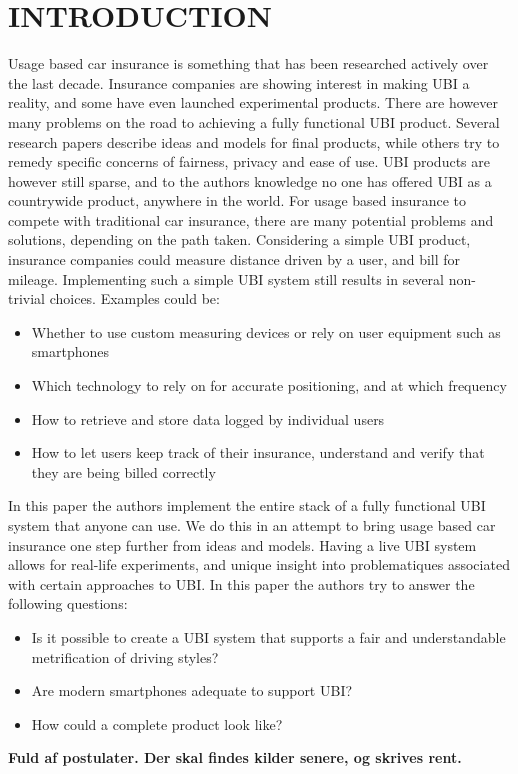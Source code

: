 \section{INTRODUCTION}\label{sec:intro}
Usage based car insurance is something that has been researched actively over the last decade. Insurance companies are showing interest in making UBI a reality, and some have even launched experimental products. There are however many problems on the road to achieving a fully functional UBI product. Several research papers describe ideas and models for final products, while others try to remedy specific concerns of fairness, privacy and ease of use. UBI products are however still sparse, and to the authors knowledge no one has offered UBI as a countrywide product, anywhere in the world.
For usage based insurance to compete with traditional car insurance, there are many potential problems and solutions, depending on the path taken. Considering a simple UBI product, insurance companies could measure distance driven by a user, and bill for mileage. Implementing such a simple UBI system still results in several non-trivial choices. Examples could be:

\begin{itemize}
\item Whether to use custom measuring devices or rely on user equipment such as smartphones
\item Which technology to rely on for accurate positioning, and at which frequency
\item How to retrieve and store data logged by individual users
\item How to let users keep track of their insurance, understand and verify that they are being billed correctly
\end{itemize}

In this paper the authors implement the entire stack of a fully functional UBI system that anyone can use. We do this in an attempt to bring usage based car insurance one step further from ideas and models. Having a live UBI system allows for real-life experiments, and unique insight into problematiques associated with certain approaches to UBI. In this paper the authors try to answer the following questions:

\begin{itemize}
\item Is it possible to create a UBI system that supports a fair and understandable metrification of driving styles?
\item Are modern smartphones adequate to support UBI?
\item How could a complete product look like?
\end{itemize}

\textbf{Fuld af postulater. Der skal findes kilder senere, og skrives rent.}


